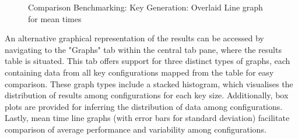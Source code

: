 \documentclass[]{final_report}
\theoremstyle{definition}
\begin{document}
\begin{figure}[H]
\begin{minipage}{0.7\textwidth}
        \centering
        \caption{Comparison Benchmarking: Key Generation: Overlaid Line graph for mean times}
        \label{fig:image2}
    \end{minipage}
\end{figure}
An alternative graphical representation of the results can be accessed by navigating to the "Graphs" tab within the central tab pane, where the results table is situated. This tab offers support for three distinct types of graphs, each containing data from all key configurations mapped from the table for easy comparison. These graph types include a stacked histogram, which visualises the distribution of results among configurations for each key size. Additionally, box plots are provided for inferring the distribution of data among configurations. Lastly, mean time line graphs (with error bars for standard deviation) facilitate comparison of average performance and variability among configurations.
\end{document}
